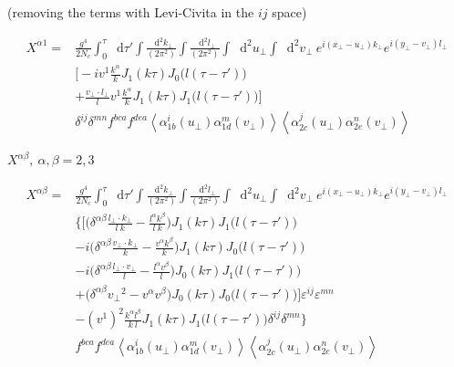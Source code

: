 \documentclass[12pt]{article}
\newcommand*\diff{\mathop{}\!\mathrm{d}}
\begin{document}
(removing the terms with Levi-Civita in the $ij$ space)

\begin{equation*}
\begin{split}
 X^{\alpha 1} = &
\frac{g^4}{2 N_c}
\int_0^\tau \diff \tau'
\int \frac{\diff^2 k_\perp}{(2\pi^2)}
\int \frac{\diff^2 l_\perp}{(2\pi^2)}
\int \diff^2 u_\perp
\int \diff^2 v_\perp ~
e^{i (x_\perp - u_\perp) k_\perp}
e^{i (y_\perp - v_\perp) l_\perp} \\
& \bigg[  - i v^1 \frac{k^\alpha}{k} J_1(k \tau) J_0\big(l(\tau-\tau')\big)   \\
& + \frac{v_\perp \cdot l_\perp}{l}  v^1 \frac{k^\alpha}{k} J_1(k\tau) J_1\big(l(\tau-\tau')\big)  \bigg]\\
& \delta^{ij} \delta^{mn}  f^{bca} f^{dea}
\left< \alpha^i_{1b} (u_\perp) \alpha^m_{1d} (v_\perp) \right>  \left< \alpha^j_{2c} (u_\perp) \alpha^n_{2e} (v_\perp) \right>
\end{split}
\end{equation*}


\newpage

$X^{\alpha \beta}, ~\alpha, \beta=2,3$

\begin{equation*}
\begin{split}
 X^{\alpha \beta} = &
\frac{g^4}{2 N_c}
\int_0^\tau \diff \tau'
\int \frac{\diff^2 k_\perp}{(2\pi^2)}
\int \frac{\diff^2 l_\perp}{(2\pi^2)}
\int \diff^2 u_\perp
\int \diff^2 v_\perp ~
e^{i (x_\perp - u_\perp) k_\perp}
e^{i (y_\perp - v_\perp) l_\perp} \\
& \bigg\{ \bigg[ \Big(\delta^{\alpha \beta} \frac{l_\perp \cdot k_\perp}{l ~k} - \frac{l^\alpha k^\beta}{l ~k}\Big) J_1 (k \tau) J_1\big(l(\tau-\tau')\big) \\
& -i \Big(\delta^{\alpha \beta} \frac{v_\perp \cdot k_\perp}{k} - \frac{v^\alpha k^\beta}{k}\Big) J_1 (k \tau) J_0\big(l(\tau-\tau')\big) \\
& -i \Big(\delta^{\alpha \beta} \frac{l_\perp \cdot v_\perp}{l} - \frac{l^\alpha v^\beta}{l}\Big) J_0 (k \tau) J_1\big(l(\tau-\tau')\big) \\
& + \big(\delta^{\alpha \beta} {v_\perp}^2 - v^\alpha v^\beta\big) J_0 (k \tau) J_0\big(l(\tau-\tau')\big) \bigg] \varepsilon^{ij} \varepsilon^{mn} \\ 
& -(v^1)^2 \frac{k^\alpha l^\beta}{k ~l} J_1 (k \tau) J_1\big(l(\tau-\tau')\big) \delta^{ij} \delta^{mn} \bigg\} \\
&  f^{bca} f^{dea}
\left< \alpha^i_{1b} (u_\perp) \alpha^m_{1d} (v_\perp) \right>  \left< \alpha^j_{2c} (u_\perp) \alpha^n_{2e} (v_\perp) \right>
\end{split}
\end{equation*}
\end{document}
